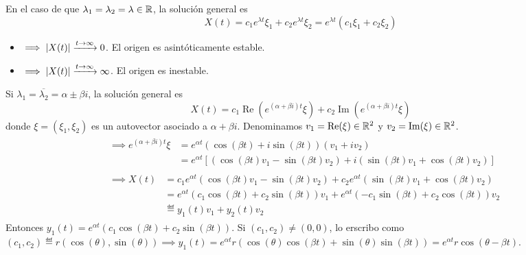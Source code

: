 
En el caso de que $\lambda_1 = \lambda_2 = \lambda \in \mathbb{R}$, la solución general es
\[X(t) = c_1 e^{\lambda t} \xi_1 + c_2 e^{\lambda t} \xi_2 = e^{\lambda t} (c_1 \xi_1 + c_2 \xi_2)\]
\begin{itemize}
	\item {} $\implies \left|X(t)\right| \xrightarrow{t\to\infty} 0$. El origen es asintóticamente estable.
	\item {} $\implies \left|X(t)\right| \xrightarrow{t\to\infty} \infty$. El origen es inestable.
\end{itemize}

Si $\lambda_1 = \overline{\lambda_2} = \alpha \pm \beta i$, la solución general es
\[X(t) = c_1 \operatorname{Re}\left(e^{(\alpha + \beta i)t} \xi\right) + c_2 \operatorname{Im}\left(e^{(\alpha + \beta i)t} \xi\right)\]
donde $\xi = (\xi_1, \xi_2)$ es un autovector asociado a $\alpha + \beta i$. Denominamos $v_1 = \operatorname{Re}(\xi)\in \mathbb{R}^2$ y $v_2 = \operatorname{Im}(\xi) \in \mathbb{R}^2$.
\[\begin{aligned}
		 & \begin{aligned}
			   \implies e^{(\alpha + \beta i)t} \xi & = e^{\alpha t} \left(\cos(\beta t) + i\sin(\beta t)\right) (v_1 + iv_2)                                                              \\
			                                        & = e^{\alpha t} \left[\left(\cos(\beta t) v_1 - \sin(\beta t) v_2\right) + i\left(\sin(\beta t) v_1 + \cos(\beta t) v_2\right)\right]
		   \end{aligned}    \\
		 & \begin{aligned}
			   \implies X(t) & = c_1 e^{\alpha t} \left(\cos(\beta t) v_1 - \sin(\beta t) v_2\right) + c_2 e^{\alpha t} \left(\sin(\beta t) v_1 + \cos(\beta t) v_2\right)  \\
			                 & = e^{\alpha t} \left(c_1 \cos(\beta t) + c_2 \sin(\beta t)\right) v_1 + e^{\alpha t} \left(-c_1 \sin(\beta t) + c_2 \cos(\beta t)\right) v_2 \\
			                 & \eqdef y_1(t) v_1 + y_2(t) v_2
		   \end{aligned}
	\end{aligned}\]
Entonces $y_1(t) = e^{\alpha t} \left(c_1 \cos(\beta t) + c_2 \sin(\beta t)\right)$. Si $(c_1, c_2) \neq (0, 0)$, lo erscribo como $(c_1, c_2) \eqdef r(\cos(\theta), \sin(\theta)) \implies y_1(t) = e^{\alpha t} r \left(\cos(\theta) \cos(\beta t) + \sin(\theta) \sin(\beta t)\right) = e^{\alpha t} r \cos(\theta - \beta t)$.

